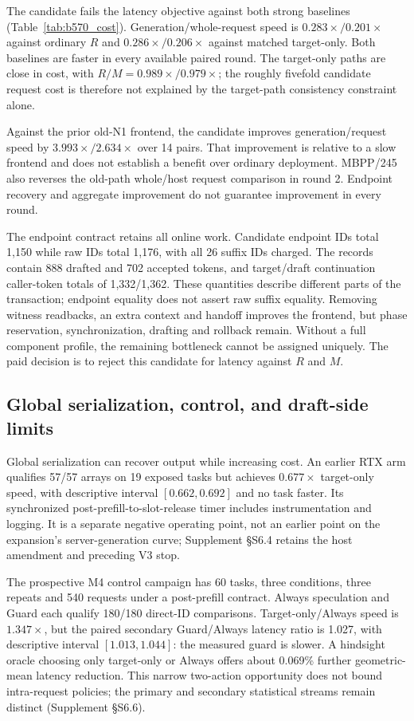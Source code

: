 The candidate fails the latency objective against both strong baselines (Table~\ref{tab:b570_cost}). Generation/whole-request speed is $0.283\times/0.201\times$ against ordinary $R$ and $0.286\times/0.206\times$ against matched target-only. Both baselines are faster in every available paired round. The target-only paths are close in cost, with $R/M=0.989\times/0.979\times$; the roughly fivefold candidate request cost is therefore not explained by the target-path consistency constraint alone.



Against the prior old-N1 frontend, the candidate improves generation/request speed by $3.993\times/2.634\times$ over 14 pairs. That improvement is relative to a slow frontend and does not establish a benefit over ordinary deployment. MBPP/245 also reverses the old-path whole/host request comparison in round 2. Endpoint recovery and aggregate improvement do not guarantee improvement in every round.

The endpoint contract retains all online work. Candidate endpoint IDs total 1,150 while raw IDs total 1,176, with all 26 suffix IDs charged. The records contain 888 drafted and 702 accepted tokens, and target/draft continuation caller-token totals of 1,332/1,362. These quantities describe different parts of the transaction; endpoint equality does not assert raw suffix equality. Removing witness readbacks, an extra context and handoff improves the frontend, but phase reservation, synchronization, drafting and rollback remain. Without a full component profile, the remaining bottleneck cannot be assigned uniquely. The paid decision is to reject this candidate for latency against $R$ and $M$.

\subsection{Global serialization, control, and draft-side limits}
Global serialization can recover output while increasing cost. An earlier RTX arm qualifies 57/57 arrays on 19 exposed tasks but achieves $0.677\times$ target-only speed, with descriptive interval $[0.662,0.692]$ and no task faster. Its synchronized post-prefill-to-slot-release timer includes instrumentation and logging. It is a separate negative operating point, not an earlier point on the expansion's server-generation curve; Supplement \S S6.4 retains the host amendment and preceding V3 stop.

The prospective M4 control campaign has 60 tasks, three conditions, three repeats and 540 requests under a post-prefill contract. Always speculation and Guard each qualify 180/180 direct-ID comparisons. Target-only/Always speed is $1.347\times$, but the paired secondary Guard/Always latency ratio is 1.027, with descriptive interval $[1.013,1.044]$: the measured guard is slower. A hindsight oracle choosing only target-only or Always offers about 0.069\% further geometric-mean latency reduction. This narrow two-action opportunity does not bound intra-request policies; the primary and secondary statistical streams remain distinct (Supplement \S S6.6).

